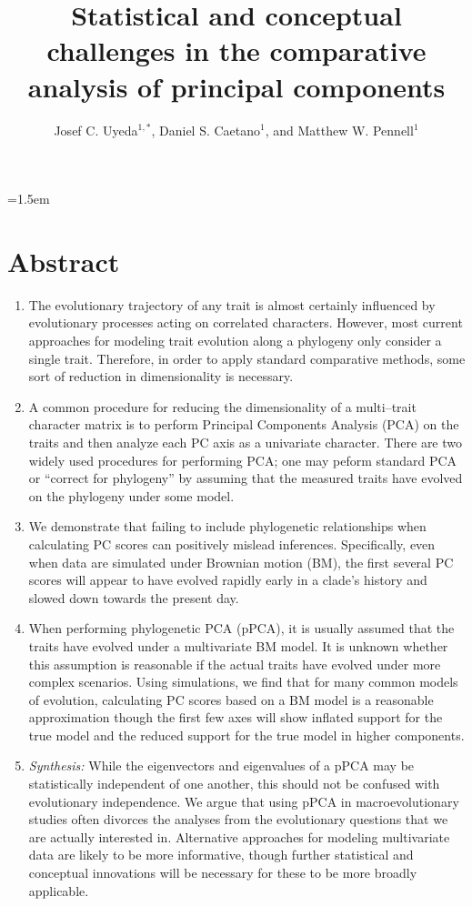 \documentclass[a4paper,12pt]{article}
\title{Statistical and conceptual challenges in the comparative analysis of principal components}
\author{
Josef C. Uyeda$^{1,*}$, Daniel S. Caetano$^1$, and Matthew W. Pennell$^1$
}
\date{}
\affiliation{
 $^{1}$ Department of Biological Sciences \& Institute for Bioinformatics and Evolutionary Studies, University of Idaho, Moscow, ID 83844, U.S.A.\\ 
 $^{*}$ Email for correspondence: \texttt{pseudacris@gmail.com}\\
}
\begin{document}
\mstitlepage
\parindent=1.5em
\addtolength{\parskip}{.3em}
\vfill

\section{Abstract}
\begin{enumerate}
\item The evolutionary trajectory of any trait is almost certainly influenced by evolutionary processes acting on correlated characters. However, most current approaches for modeling trait evolution along a phylogeny only consider a single trait. Therefore, in order to apply standard comparative methods, some sort of reduction in dimensionality is necessary.

\item A common procedure for reducing the dimensionality of a multi--trait character matrix is to perform Principal Components Analysis (PCA) on the traits and then analyze each PC axis as a univariate character. There are two widely used procedures for performing PCA; one may peform standard PCA or ``correct for phylogeny'' by assuming that the measured traits have evolved on the phylogeny under some model.

\item We demonstrate that failing to include phylogenetic relationships when calculating PC scores can positively mislead inferences. Specifically, even when data are simulated under Brownian motion (BM), the first several PC scores will appear to have evolved rapidly early in a clade's history and slowed down towards the present day.

\item When performing phylogenetic PCA (pPCA), it is usually assumed that the traits have evolved under a multivariate BM model. It is unknown whether this assumption is reasonable if the actual traits have evolved under more complex scenarios. Using simulations, we find that for many common models of evolution, calculating PC scores based on a BM model is a reasonable approximation though the first few axes will show inflated support for the true model and the reduced support for the true model in higher components.

\item \emph{Synthesis:} While the eigenvectors and eigenvalues of a pPCA may be statistically independent of one another, this should not be confused with evolutionary independence. We argue that using pPCA in macroevolutionary studies often divorces the analyses from the evolutionary questions that we are actually interested in. Alternative approaches for modeling multivariate data are likely to be more informative, though further statistical and conceptual innovations will be necessary for these to be more broadly applicable.
\end{enumerate} 
\end{document}
